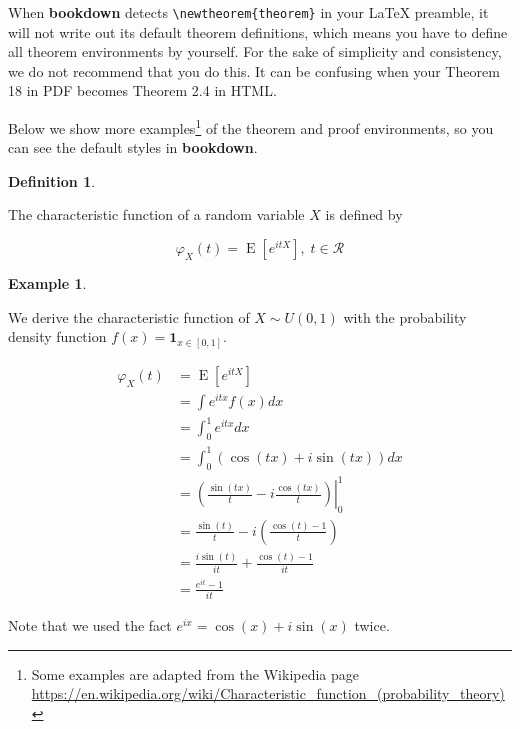 \documentclass[
  12pt,
]{krantz}
\theoremstyle{definition}
\newtheorem{definition}{Definition}[chapter]
\theoremstyle{definition}
\newtheorem{example}{Example}[chapter]
\theoremstyle{definition}
\theoremstyle{definition}
\theoremstyle{remark}
\begin{document}
When \textbf{bookdown} detects \texttt{\textbackslash{}newtheorem\{theorem\}} in your LaTeX preamble, it will not write out its default theorem definitions, which means you have to define all theorem environments by yourself. For the sake of simplicity and consistency, we do not recommend that you do this. It can be confusing when your Theorem 18 in PDF becomes Theorem 2.4 in HTML.

Below we show more examples\footnote{Some examples are adapted from the Wikipedia page \url{https://en.wikipedia.org/wiki/Characteristic_function_(probability_theory)}} of the theorem and proof environments, so you can see the default styles in \textbf{bookdown}.

\begin{definition}
\protect\hypertarget{def:unlabeled-div-1}{}\label{def:unlabeled-div-1}

The characteristic function of a random variable \(X\) is defined by

\[\varphi _{X}(t)=\operatorname {E} \left[e^{itX}\right], \; t\in\mathcal{R}\]

\end{definition}

\begin{example}
\protect\hypertarget{exm:unlabeled-div-2}{}\label{exm:unlabeled-div-2}

We derive the characteristic function of \(X\sim U(0,1)\) with the probability density function \(f(x)=\mathbf{1}_{x \in [0,1]}\).

\begin{equation*}
\begin{split}
\varphi _{X}(t) &= \operatorname {E} \left[e^{itX}\right]\\
 & =\int e^{itx}f(x)dx\\
 & =\int_{0}^{1}e^{itx}dx\\
 & =\int_{0}^{1}\left(\cos(tx)+i\sin(tx)\right)dx\\
 & =\left.\left(\frac{\sin(tx)}{t}-i\frac{\cos(tx)}{t}\right)\right|_{0}^{1}\\
 & =\frac{\sin(t)}{t}-i\left(\frac{\cos(t)-1}{t}\right)\\
 & =\frac{i\sin(t)}{it}+\frac{\cos(t)-1}{it}\\
 & =\frac{e^{it}-1}{it}
\end{split}
\end{equation*}

Note that we used the fact \(e^{ix}=\cos(x)+i\sin(x)\) twice.

\end{example}
\end{document}
